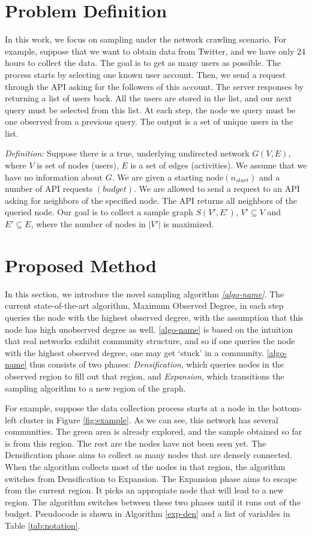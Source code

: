 \section{Problem Definition}
In this work, we focus on sampling under the network crawling scenario.  For example, suppose that we want to obtain data from Twitter, and we have only 24 hours to collect the data. The goal is to get as many users as possible. The process starts by selecting one known user account. Then, we send a request through the API asking for the followers of this account. The server responses by returning a list of users back.  All the users are stored in the list, and our next query must be selected from this list.  At each step, the node we query must be one observed from a previous query.  The output is a set of unique users in the list.

\textit{Definition:} Suppose there is a true, underlying undirected network $G(V,E)$, where $V$ is set of nodes (users), $E$ is a set of edges (activities).  We assume that we have no information about $G$.  We are given a starting node$(n_{start})$ and a number of API requests $(budget)$. We are allowed to send a request to an API asking for neighbors of the specified node. The API returns all neighbors of the queried node. Our goal is to collect a sample graph $S(V',E')$, $V' \subseteq V$ and $E' \subseteq E$, where the number of nodes in $|V'|$ is maximized. 


\section{Proposed Method}
In this section, we introduce the novel sampling algorithm \textit{\ref{algo-name}}.  The current state-of-the-art algorithm, Maximum Observed Degree, in each step queries the node with the highest observed degree, with the assumption that this node has high unobserved degree as well.  \ref{algo-name} is based on the intuition that real networks exhibit community structure, and so if one queries the node with the highest observed degree, one may get `stuck' in a community.  \ref{algo-name} thus consists of two phases: \textit{Densification}, which queries nodes in the observed region to fill out that region, and \textit{Expansion}, which transitions the sampling algorithm to a new region of the graph.

For example, suppose the data collection process starts at a node in the bottom-left cluster in Figure \ref{fig:example}. As we can see, this network has several communities. The green area is already explored, and the sample obtained so far is from this region. The rest are the nodes have not been seen yet. The Densification phase aims to collect as many nodes that are densely connected. When the algorithm collects most of the nodes in that region, the algorithm switches from Densification to Expansion. The Expansion phase aims to escape from the current region. It picks an appropiate node that will lead to a new region. The algorithm switches between these two phases until it runs out of the budget. Pseudocode is shown in Algorithm \ref{exp-den} and a list of variables in Table \ref{tab:notation}.

